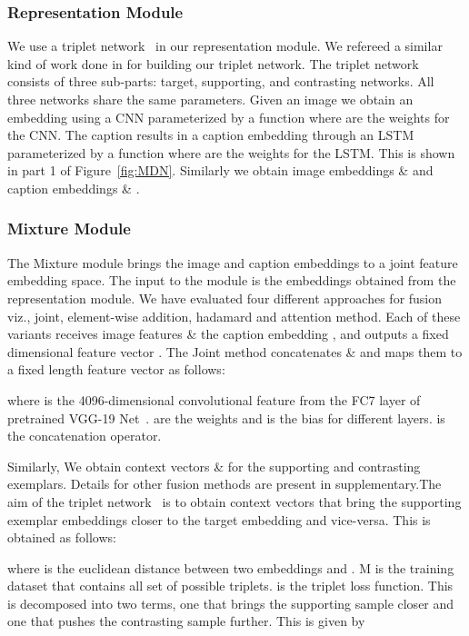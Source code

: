 \documentclass[11pt,a4paper]{article}
\begin{document}
\subsubsection{Representation Module}
We use a triplet network~\cite{Frome_ICCV2007,Hoffer_Springer2015} in our representation module. 
We refereed a similar kind of work done in \cite{Patro_CVPR2018} for building our triplet network. The triplet network consists of three sub-parts: target, supporting, and contrasting networks. All three networks share the same parameters. Given an image  we obtain an embedding  using a CNN parameterized by a function  where  are the weights for the CNN. The caption  results in a caption embedding  through an LSTM parameterized by a function  where  are the weights for the LSTM. This is shown in part 1 of Figure~\ref{fig:MDN}. Similarly we obtain image embeddings  \&   and  caption embeddings  \& .  


\subsubsection{Mixture Module}\label{mixture_model}
The Mixture module brings the image and caption embeddings to a joint feature embedding space. The input to the module is the embeddings obtained from the representation module. We have evaluated four different approaches for fusion viz., joint, element-wise addition, hadamard and attention method. Each of these variants receives image features  \& the caption embedding , and outputs a fixed dimensional feature vector .  
The Joint method concatenates   \&  and maps them to a fixed length feature vector  as follows:

where  is  the 4096-dimensional  convolutional feature from the  FC7 layer of pretrained VGG-19 Net~\cite{simonyan_arXiv2014}.  are the weights and  is the bias for different layers.  is the concatenation operator. 



 Similarly, We obtain context vectors   \&  for the supporting and contrasting exemplars. Details for other fusion methods are present in supplementary.The aim of the triplet network~\cite{Schroff_CVPR2015} is to obtain context vectors that bring the supporting exemplar embeddings closer to the target embedding and vice-versa.
This is obtained as follows:

where  is the euclidean distance between two embeddings  and  . M is the training dataset that contains all set of possible triplets.  is the triplet loss function. This is decomposed into two terms, one that brings the supporting sample closer and one that pushes the contrasting sample further. This is given by 
\end{document}
